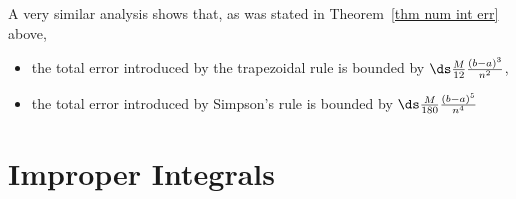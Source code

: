 A very similar analysis shows that, as was stated in Theorem~\ref{thm num int err}
above,
\begin{itemize}
 \item the total error introduced by the trapezoidal rule is bounded by
$\ds \frac{M}{12}\frac{(b-a)^3}{n^2}$,
\item the total error introduced by Simpson's rule is bounded by
$\ds \frac{M}{180}\frac{(b-a)^5}{n^4}$
\end{itemize}

\section{Improper Integrals}\label{sec improp int}
